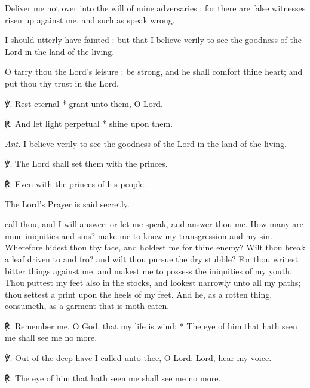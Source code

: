 Deliver me not over into the will of mine adversaries : for there are false witnesses risen up against me, and such as speak wrong.\par
{}I should utterly have fainted : but that I believe verily to see the goodness of the Lord in the land of the living.\par
{}O tarry thou the Lord's leisure : be strong, and he shall comfort thine heart; and put thou thy trust in the Lord.\par
℣. Rest eternal * grant unto them, O Lord.\par
℟. And let light perpetual * shine upon them.\par\noindent
\textit{Ant.} I believe verily to see the goodness of the Lord in the land of the living.\par
\vspace{0.5\baselineskip}
℣. The Lord shall set them with the princes.\par
℟. Even with the princes of his people.\par
\begin{rubric}
    {The Lord's Prayer is said secretly.}
\end{rubric}
 call thou, and I will answer: or let me speak, and answer thou me. How many are mine iniquities and sins? make me to know my transgression and my sin. Wherefore hidest thou thy face, and holdest me for thine enemy? Wilt thou break a leaf driven to and fro? and wilt thou pursue the dry stubble? For thou writest bitter things against me, and makest me to possess the iniquities of my youth. Thou puttest my feet also in the stocks, and lookest narrowly unto all my paths; thou settest a print upon the heels of my feet. And he, as a rotten thing, consumeth, as a garment that is moth eaten.\par
℟. Remember me, {\dag} O God, that my life is wind: * The eye of him that hath seen me shall see me no more.\par
℣. Out of the deep have I called unto thee, O Lord: Lord, hear my voice.\par
℟. The eye of him that hath seen me shall see me no more.

